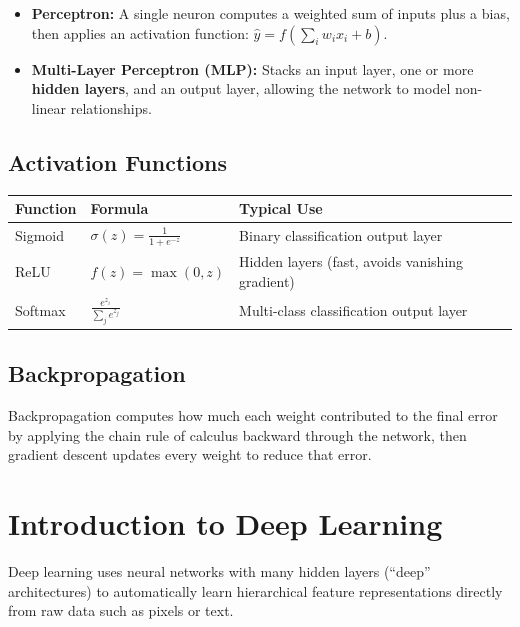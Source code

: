 \documentclass[11pt,a4paper]{article}
\begin{document}
\begin{itemize}[leftmargin=*]
  \item \textbf{Perceptron:} A single neuron computes a weighted sum of inputs plus a bias, then applies an activation function: $\hat{y} = f\left(\sum_i w_i x_i + b\right)$.
  \item \textbf{Multi-Layer Perceptron (MLP):} Stacks an input layer, one or more \textbf{hidden layers}, and an output layer, allowing the network to model non-linear relationships.
\end{itemize}

\subsection{Activation Functions}
\begin{center}
\begin{tabular}{@{}p{2.2cm}p{5.6cm}p{5.2cm}@{}}
\toprule
\rowcolor{primary!15}
\textbf{Function} & \textbf{Formula} & \textbf{Typical Use} \\
\midrule
Sigmoid & $\sigma(z) = \frac{1}{1+e^{-z}}$ & Binary classification output layer \\
ReLU & $f(z) = \max(0,z)$ & Hidden layers (fast, avoids vanishing gradient) \\
Softmax & $\frac{e^{z_i}}{\sum_j e^{z_j}}$ & Multi-class classification output layer \\
\bottomrule
\end{tabular}
\end{center}

\subsection{Backpropagation}
\begin{conceptbox}
Backpropagation computes how much each weight contributed to the final error by applying the chain rule of calculus backward through the network, then gradient descent updates every weight to reduce that error.
\end{conceptbox}

\section{Introduction to Deep Learning}

\begin{definitionbox}
Deep learning uses neural networks with many hidden layers (``deep'' architectures) to automatically learn hierarchical feature representations directly from raw data such as pixels or text.
\end{definitionbox}
\end{document}
